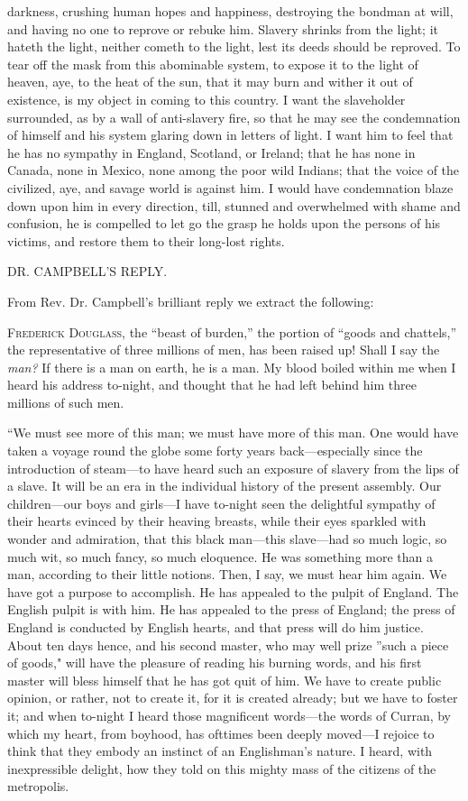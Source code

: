darkness, crushing human hopes and happiness, destroying the bondman at
will, and having no one to reprove or rebuke him. Slavery shrinks from
the light; it hateth the light, neither cometh to the light, lest its
deeds should be reproved. To tear off the mask from this abominable
system, to expose it to the light of heaven, aye, to the heat of the
sun, that it may burn and wither it out of existence, is my object in
coming to this country. I want the slaveholder surrounded, as by a wall
of anti-slavery fire, so that he may see the condemnation of himself and
his system glaring down in letters of light. I want him to feel that he
has no sympathy in England, Scotland, or Ireland; that he has none in
Canada, none in Mexico, none among the poor wild Indians; that the voice
of the civilized, aye, and savage world is against him. I would have
condemnation blaze down upon him in every direction, till, stunned and
overwhelmed with shame and confusion, he is compelled to let go the
grasp he holds upon the persons of his victims, and restore them to
their long-lost rights.

{\protect\hypertarget{419}{}{}}

DR. CAMPBELL'S REPLY.

From Rev. Dr. Campbell's brilliant reply we extract the following:

\textsc{Frederick Douglass}, the ``beast of burden,'' the portion of
``goods and chattels,'' the representative of three millions of men, has
been raised up! Shall I say the \emph{man?} If there is a man on earth,
he is a man. My blood boiled within me when I heard his address
to-night, and thought that he had left behind him three millions of such
men.

``We must see more of this man; we must have more of this man. One would
have taken a voyage round the globe some forty years back---especially
since the introduction of steam---to have heard such an exposure of
slavery from the lips of a slave. It will be an era in the individual
history of the present assembly. Our children---our boys and girls---I
have to-night seen the delightful sympathy of their hearts evinced by
their heaving breasts, while their eyes sparkled with wonder and
admiration, that this black man---this slave---had so much logic, so
much wit, so much fancy, so much eloquence. He was something more than a
man, according to their little notions. Then, I say, we must hear him
again. We have got a purpose to accomplish. He has appealed to the
pulpit of England. The English pulpit is with him. He has appealed to
the press of England; the press of England is conducted by English
hearts, and that press will do him justice. About ten days hence, and
his second master, who may well prize ''such a piece of goods," will
have the pleasure of reading his burning words, and his first master
will bless himself that he has got quit of him. We have to create public
opinion, or rather, not to create it, for it is created already; but we
have to foster it; and when to-night I heard those magnificent
words---the words of Curran, by which my heart, from boyhood, has
ofttimes been deeply moved---I rejoice to think that they embody an
instinct of an Englishman's nature. I heard, with inexpressible delight,
how they told on this mighty mass of the citizens of the metropolis.

